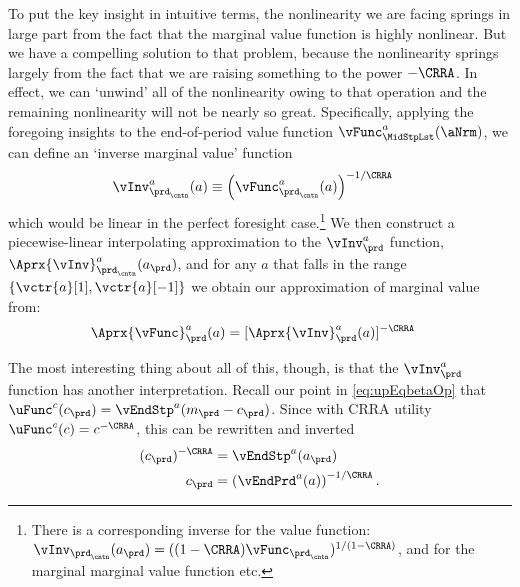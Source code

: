 \documentclass[\econtexRoot/SolvingMicroDSOPs]{subfiles}
\begin{document}
To put the key insight in intuitive terms, the nonlinearity we are facing springs in large part from the fact that the marginal value function is highly nonlinear.  But we have a compelling solution to that problem, because the nonlinearity springs largely from the fact that we are raising something to the power $-\CRRA$.  In effect, we can `unwind' all of the nonlinearity owing to that operation and the remaining nonlinearity will not be nearly so great.  Specifically, applying the foregoing insights to the end-of-period value function $\vFunc^{a}_{\MidStpLst}(\aNrm)$, we can define an `inverse marginal value' function
\begin{equation}\begin{gathered}\begin{aligned}
      \vInv_{\prd_\cntn}^{a}(a)  & \equiv  \left(\vFunc^{a}_{\prd_\cntn}(a)\right)^{-1/\CRRA} \label{eq:cGoth}
    \end{aligned}\end{gathered}\end{equation}
which would be linear in the perfect foresight case.\footnote{There is a corresponding inverse for the value function: $\vInv_{\prd_\cntn}(a_{\prd})=((1-\CRRA)\vFunc_{\prd_\cntn})^{1/(1-\CRRA)}$, and for the marginal marginal value function etc.}  We then construct a piecewise-linear interpolating approximation to the $\vInv_{\prd}^{a}$ function, $\Aprx{\vInv}_{\prd_\cntn}^{a}(a_{\prd})$, and for any $a$ that falls in the range $\{\vctr{a}[1],\vctr{a}[-1]\}$ we obtain our approximation of marginal value from:
\begin{equation}\begin{gathered}\begin{aligned}
      \Aprx{\vFunc}_{\prd}^{a}(a) & =
      [\Aprx{\vInv}_{\prd}^{a}(a)]^{-\CRRA}
    \end{aligned}\end{gathered}\end{equation}

The most interesting thing about all of this, though, is that the $\vInv^{a}_{\prd}$ function has another interpretation. Recall our point in \eqref{eq:upEqbetaOp} that $\uFunc^{c}(c_{\prd}) = \vEndStp^{a}(m_{\prd}-c_{\prd})$.  Since with CRRA utility $\uFunc^{c}(c)=c^{-\CRRA}$, this can be rewritten
and inverted
\begin{equation}\begin{gathered}\begin{aligned}
      (c_{\prd})^{-\CRRA} & = \vEndStp^{a}(a_{\prd})
      \\ c_{\prd} & =      \left(\vEndPrd^{a}(a)\right)^{-1/\CRRA}.
    \end{aligned}\end{gathered}\end{equation}
\end{document}
